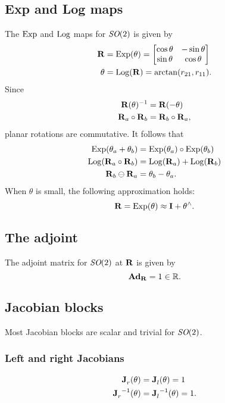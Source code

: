 \subsection{Exp and Log maps} \label{sec:Exp-Log-SO2}
The $\Exp$ and $\Log$ maps for $\SO(2)$ is given by
\begin{align}
  \matR &= \Exp(\theta) = 
  \begin{bmatrix}
    \cos \theta & -\sin \theta \\
    \sin \theta & \cos \theta
  \end{bmatrix}\\
  \theta &= \Log(\matR) = \arctan(r_{21}, r_{11}).
\end{align}
Since
\begin{align}
  \matR(\theta)^{-1} &= \matR(-\theta)\\
  \matR_a \circ \matR_b &= \matR_b \circ \matR_a,
\end{align}
planar rotations are commutative.
It follows that
\begin{align}
  \Exp(\theta_a + \theta_b) &= \Exp(\theta_a) \circ \Exp(\theta_b)\\
  \Log(\matR_a \circ \matR_b) &= \Log(\matR_a) + \Log(\matR_b)\\
  \matR_b \ominus \matR_a &= \theta_b - \theta_a.
\end{align}
When $\theta$ is small, the following approximation holds:
\begin{equation} \label{eq:SO2-Exp-approx}
  \matR = \Exp(\theta) \approx \matI + \theta^\wedge.
\end{equation}

\subsection{The adjoint}
The adjoint matrix for $\SO(2)$ at $\matR$ is given by
\begin{equation}
  \mAd_\matR = 1 \in \bbR.
\end{equation}

\subsection{Jacobian blocks} \label{sec:Jacobians-SO2}
Most Jacobian blocks are scalar and trivial for $\SO(2)$.

\subsubsection*{Left and right Jacobians}
\begin{align}
\jac{}{r}(\theta) &= \jac{}{l}(\theta) = 1\\
\jac{}{r}^{-1}(\theta) &= \jac{}{l}^{-1}(\theta) = 1.
\end{align}

